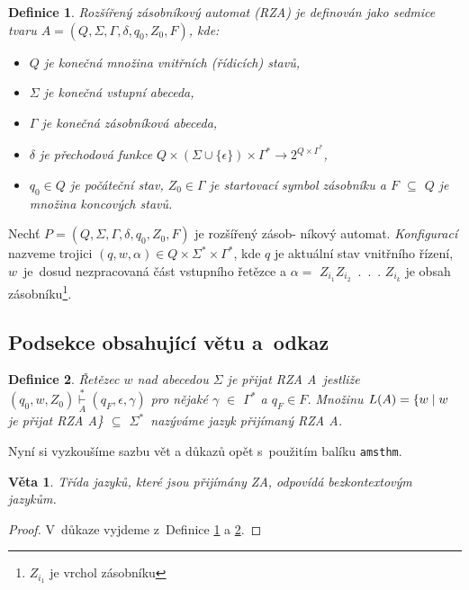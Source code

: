 \documentclass[11pt,a4paper,twocolumn]{article}
\newtheorem{veta}{Věta}
\newtheorem{definice}{Definice}
\begin{document}
\begin{definice}\label{definice}
\textnormal{Rozšířený zásobníkový automat} \textit{(RZA) je definován jako sedmice tvaru $A= (Q, \Sigma, \Gamma, \delta, q_0, Z_0, F)$,
kde:}
\begin{itemize}
\item \textit{$Q$ je konečná množina \textnormal{vnitřních (řídicích) stavů,}}
\item \textit{$\Sigma$ je konečná \textnormal{vstupní abeceda,}}
\item \textit{$\Gamma$ je konečná \textnormal{zásobníková abeceda,}}
\item \textit{$\delta$ je \textnormal{přechodová funkce} 
$Q\times(\Sigma\cup\{\epsilon\})\times\Gamma^*\rightarrow2^{Q\times\Gamma^*}$,}
\item \textit{$q_0 \in Q$ je \textnormal{počáteční stav,} $Z_0 \in \Gamma$ je \textnormal{startovací symbol
zásobníku} a $F$ $\subseteq$ $Q$ je množina} \textnormal{koncových stavů.}
\end{itemize}
\end{definice}

Nechť \textit{$P = (Q, \Sigma, \Gamma, \delta, q_0, Z_0, F)$} je rozšířený zásob- níkový automat. \textit{Konfigurací} nazveme trojici $(q, w, \alpha)\in Q\times\Sigma^*\times\Gamma^*$, kde $q$ je aktuální stav vnitřního řízení,
$w$~je~dosud nezpracovaná část vstupního řetězce a $\alpha =$
$Z_{i_1}Z_{i_2}$~.~.~. $Z_{i_k}$ je obsah zásobníku\footnote{$Z_{i_1}$ je vrchol zásobníku}.

\subsection{Podsekce obsahující větu a~odkaz}
\begin{definice}\label{definice2}
\textnormal{Řetězec $w$ nad abecedou $\Sigma$ je přijat RZA}
A~jestliže $(q_0, w, Z_0) \underset{A}{\overset{*}{\vdash}} (q_F, \epsilon, \gamma)$ pro nějaké $\gamma$ $\in$  $\Gamma^{*}$ a 
$q_F \in F$. Množinu $L(A) = \textnormal{\{} w \mid w$ je přijat RZA A\textnormal{\}} $\subseteq$
$\Sigma^{*}$~\textit{nazýváme} \textnormal{jazyk přijímaný RZA }A.
\end{definice}

Nyní si vyzkoušíme sazbu vět a důkazů opět s~použitím
balíku \verb|amsthm|.
\begin{veta}Třída jazyků, které jsou přijímány ZA, odpovídá 
\textnormal{bezkontextovým jazykům.}\end{veta}
\begin{proof}
\textnormal{V~důkaze vyjdeme z~Definice \ref{definice} a \ref{definice2}.}
\end{proof}
\end{document}

